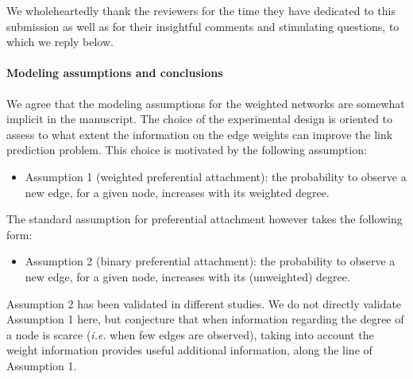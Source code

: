 \documentclass{article}
\begin{document}
We wholeheartedly thank the reviewers for the time they have dedicated to this submission as well as for their insightful comments and stimulating questions, to which we reply below.

\paragraph{Modeling assumptions and conclusions}


We agree that the modeling assumptions for the weighted networks are somewhat implicit in the manuscript. The choice of the experimental design is oriented to assess to what extent the information on the edge weights can improve the link prediction problem. This choice is motivated by the following assumption:
%
\begin{itemize}
\item Assumption 1 (weighted preferential attachment): the probability to observe a new edge, for a given node, increases with its weighted degree. 
\end{itemize}
%
The standard assumption for preferential attachment however takes the following form:
\begin{itemize}
\item Assumption 2 (binary preferential attachment): the probability to observe a new edge, for a given node, increases with its (unweighted) degree.
\end{itemize}
%
Assumption 2 has been validated in different studies. We do not directly validate Assumption 1 here, but conjecture that when information regarding the degree of a node is scarce (\textit{i.e.} when few edges are observed), taking into account the weight information provides useful additional information, along the line of Assumption 1.
\end{document}
